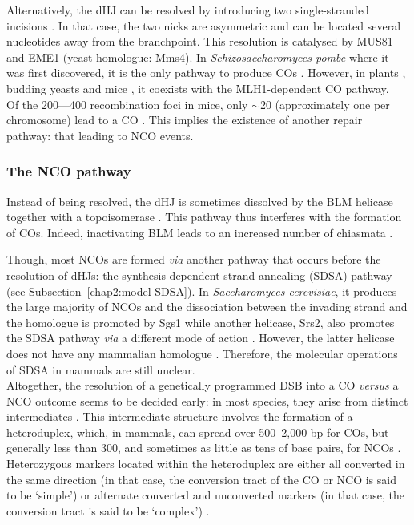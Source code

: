 Alternatively, the dHJ can be resolved by introducing two single-stranded incisions \citep{wyatt2014holliday}. 
In that case, the two nicks are asymmetric and can be located several nucleotides away from the branchpoint. 
This resolution is catalysed by MUS81 and EME1 (yeast homologue: Mms4).
In \textit{Schizosaccharomyces pombe} where it was first discovered, it is the only pathway to produce COs \citep{osman2003generating}.
However, in plants \citep{mercier2005two}, budding yeasts \citep{santos2003mus81} and mice \citep{holloway2008mus81}, it coexists with the MLH1-dependent CO pathway.\\

Of the 200—400 recombination foci in mice, only $\sim$20 (approximately one per chromosome) lead to a CO \citep{baudat2007regulating}.
This implies the existence of another repair pathway: that leading to NCO events.






\subsubsection{The NCO pathway}
Instead of being resolved, the dHJ is sometimes dissolved by the BLM helicase together with a topoisomerase \citep{wu2003bloom}. 
This pathway thus interferes with the formation of COs. Indeed, inactivating BLM leads to an increased number of chiasmata \citep{holloway2010mammalian}.

Though, most NCOs are formed \textit{via} another pathway that occurs before the resolution of dHJs: the synthesis-dependent strand annealing (SDSA) pathway (see Subsection~\ref{chap2:model-SDSA}).
In \textit{Saccharomyces cerevisiae}, it produces the large majority of NCOs \citep{martini2011genomewide} and the dissociation between the invading strand and the homologue is promoted by Sgs1 \citep{demuyt2012blm} while another helicase, Srs2, also promotes the SDSA pathway \textit{via} a different mode of action \citep{ira2003srs2}.
However, the latter helicase does not have any mammalian homologue \citep{spell2004examination}. Therefore, the molecular operations of SDSA in mammals are still unclear.\\


Altogether, the resolution of a genetically programmed DSB into a CO \textit{versus} a NCO outcome seems to be decided early: in most species, they arise from distinct intermediates \citep[reviewed in][]{hunter2015meiotic}.
This intermediate structure involves the formation of a heteroduplex, which, in mammals, can spread over 500--2,000 bp for COs, but generally less than 300, and sometimes as little as tens of base pairs, for NCOs \citep{jeffreys2004intense,ng2008quantitative}.
Heterozygous markers located within the heteroduplex are either all converted in the same direction (in that case, the conversion tract of the CO or NCO is said to be ‘simple’) or alternate converted and unconverted markers (in that case, the conversion tract is said to be ‘complex’) \citep{borts1989length}.

